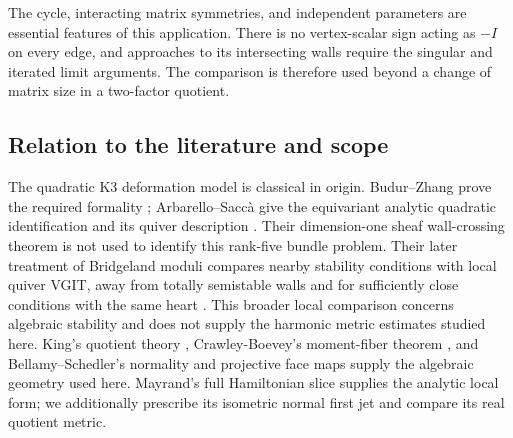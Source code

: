 The cycle, interacting matrix symmetries, and independent
parameters are essential features of this application.
There is no vertex-scalar sign acting as $-I$ on every edge,
and approaches to its intersecting walls require the singular
and iterated limit arguments. The comparison is therefore used
beyond a change of matrix size in a two-factor quotient.

\subsection{Relation to the literature and scope}
The quadratic K3 deformation model is classical in origin.
Budur--Zhang prove the required formality \cite{BZ19};
Arbarello--Sacc\`a give the equivariant analytic quadratic
identification and its quiver description
\cite[Propositions~4.4 and 6.1]{AS18}.
Their dimension-one sheaf wall-crossing theorem is not used
to identify this rank-five bundle problem.
Their later treatment of Bridgeland moduli compares nearby stability
conditions with local quiver VGIT, away from totally semistable walls
and for sufficiently close conditions with the same heart
\cite[\S6, Claim~6.1, Proposition~6.3 and Corollary~6.4]{AS25}.
This broader local comparison concerns algebraic stability and does
not supply the harmonic metric estimates studied here.
King's quotient theory \cite{King94}, Crawley-Boevey's
moment-fiber theorem \cite{CB01}, and Bellamy--Schedler's
normality and projective face maps \cite{BeSc24} supply the
algebraic geometry used here. Mayrand's full Hamiltonian slice
\cite{May22} supplies the analytic local form; we additionally
prescribe its isometric normal first jet and compare its
real quotient metric.


